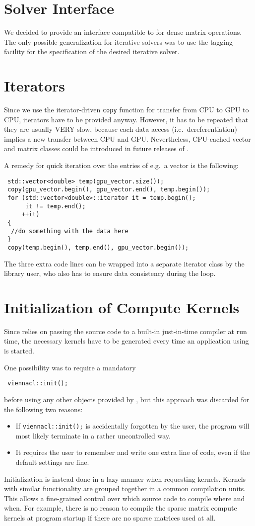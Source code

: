 \section{Solver Interface}
We decided to provide an interface compatible to {\ublas} for dense matrix
operations. The only possible generalization for iterative solvers was to use
the tagging facility for the specification of the desired iterative solver.

\section{Iterators}
Since we use the iterator-driven \lstinline|copy| function for transfer from
CPU to GPU to CPU, iterators have to be provided anyway. However, it has to be repeated
that they are usually VERY slow, because each data access (i.e.~dereferentiation) implies a new
transfer between CPU and GPU. Nevertheless, CPU-cached vector and matrix
classes could be introduced in future releases of {\ViennaCL}.

A remedy for quick iteration over the entries of e.g.~a vector is the following:
\begin{lstlisting}
 std::vector<double> temp(gpu_vector.size());
 copy(gpu_vector.begin(), gpu_vector.end(), temp.begin());  
 for (std::vector<double>::iterator it = temp.begin();
      it != temp.end();
     ++it)
 {
  //do something with the data here
 }
 copy(temp.begin(), temp.end(), gpu_vector.begin());
\end{lstlisting}
The three extra code lines can be wrapped into a separate iterator class by the library user, who also has to ensure data consistency during the loop.


\section{Initialization of Compute Kernels}
Since {\OpenCL} relies on passing the {\OpenCL} source code to a
built-in just-in-time compiler at run time, the necessary kernels have to be generated every
time an application using {\ViennaCL} is started.

One possibility was to require a mandatory
\begin{lstlisting}
 viennacl::init();
\end{lstlisting}
before using any other objects provided by {\ViennaCL}, but this approach was discarded for the following two reasons:
\begin{itemize}
 \item If \lstinline|viennacl::init();| is accidentally forgotten by the user,
the program will most likely terminate in a rather uncontrolled way. 
 \item It requires the user to remember and write one extra line of code, even
if the default settings are fine.
\end{itemize}
Initialization is instead done in a lazy manner when requesting {\OpenCL} kernels. 
Kernels with similar functionality are grouped together in a common compilation units.
This allows a fine-grained control over which source code to compile
where and when. For example, there is no reason to compile the sparse matrix
compute kernels at program startup if there are no sparse matrices used at all.

